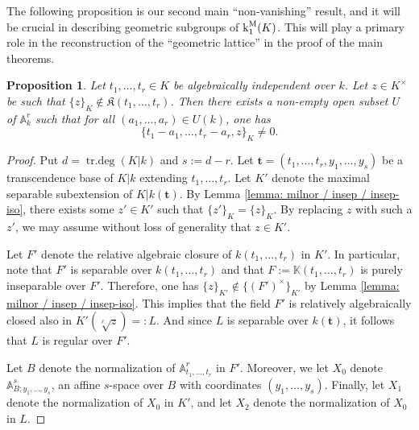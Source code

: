 \documentclass[11pt]{amsart}
\newtheorem{proposition}{Proposition}[section]
\theoremstyle{definition}
\theoremstyle{remark}
\numberwithin{equation}{section}
\DeclareMathOperator{\trdeg}{tr.deg}
\newcommand{\Abb}{\mathbb{A}}
\newcommand{\Kbb}{\mathbb{K}}
\newcommand{\tbf}{\mathbf{t}}
\newcommand{\Kfrak}{\mathfrak{K}}
\renewcommand{\k}{\operatorname{k}^{\rm M}}
\begin{document}
The following proposition is our second main ``non-vanishing'' result, and it will be crucial in describing geometric subgroups of $\k_1(K)$.
This will play a primary role in the reconstruction of the ``geometric lattice'' in the proof of the main theorems.

\begin{proposition}
\label{proposition: milnorff / geometric / geometric-maximal}
  Let $t_1,\ldots,t_r \in K$ be algebraically independent over $k$.
  Let $z \in K^\times$ be such that $\{z\}_K \notin \Kfrak(t_1,\ldots,t_r)$.
  Then there exists a non-empty open subset $U$ of $\Abb^r_k$ such that for all $(a_1,\ldots,a_r) \in U(k)$, one has
  \[ \{t_1-a_1,\ldots,t_r-a_r,z\}_K \neq 0. \]
\end{proposition}
\begin{proof}
  Put $d = \trdeg(K|k)$ and $s := d-r$.
  Let $\tbf = (t_1,\ldots,t_r,y_1,\ldots,y_s)$ be a transcendence base of $K|k$ extending $t_1,\ldots,t_r$.
  Let $K'$ denote the maximal separable subextension of $K|k(\tbf)$.
  By Lemma \ref{lemma: milnor / insep / insep-iso}, there exists some $z' \in K'$ such that $\{z'\}_K = \{z\}_K$.
  By replacing $z$ with such a $z'$, we may assume without loss of generality that $z \in K'$.

  Let $F'$ denote the relative algebraic closure of $k(t_1,\ldots,t_r)$ in $K'$.
  In particular, note that $F'$ is separable over $k(t_1,\ldots,t_r)$ and that $F := \Kbb(t_1,\ldots,t_r)$ is purely inseparable over $F'$.
  Therefore, one has $\{z\}_{K'} \notin \{(F')^\times\}_{K'}$ by Lemma \ref{lemma: milnor / insep / insep-iso}.
  This implies that the field $F'$ is relatively algebraically closed also in $K'(\sqrt[\ell]{z}) =: L$.
  And since $L$ is separable over $k(\tbf)$, it follows that $L$ is regular over $F'$.

  Let $B$ denote the normalization of $\Abb^r_{t_1,\ldots,t_r}$ in $F'$.
  Moreover, we let $X_0$ denote $\Abb^s_{B;y_1,\ldots,y_s}$, an affine $s$-space over $B$ with coordinates $(y_1,\ldots,y_s)$.
  Finally, let $X_1$ denote the normalization of $X_0$ in $K'$, and let $X_2$ denote the normalization of $X_0$ in $L$.


\end{proof}
\end{document}
